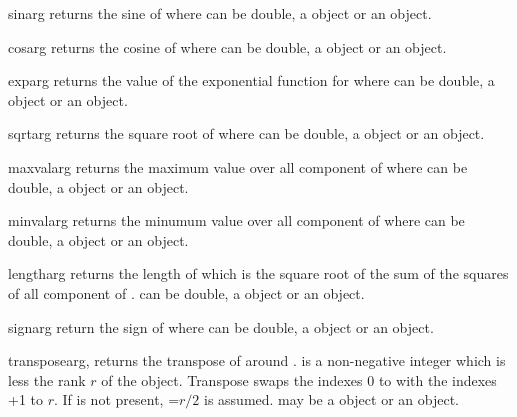 \begin{funcdesc}{sin}{arg}
returns the sine of  where 
can be double, a \Data object or an \numarray object.
\end{funcdesc}

\begin{funcdesc}{cos}{arg}
returns the cosine of  where 
can be double, a \Data object or an \numarray object.
\end{funcdesc}

\begin{funcdesc}{exp}{arg}
returns the value of the exponential function for  where 
can be double, a \Data object or an \numarray object.
\end{funcdesc}

\begin{funcdesc}{sqrt}{arg}
returns the square root of  where 
can be double, a \Data object or an \numarray object.
\end{funcdesc}

\begin{funcdesc}{maxval}{arg}
returns the maximum value over all component of  where 
can be double, a \Data object or an \numarray object.
\end{funcdesc}

\begin{funcdesc}{minval}{arg}
returns the minumum value over all component of  where 
can be double, a \Data object or an \numarray object.
\end{funcdesc}

\begin{funcdesc}{length}{arg}
returns the length of  which is the
square root of the sum of the squares of all component of . 
can be double, a \Data object or an \numarray object.
\end{funcdesc}

\begin{funcdesc}{sign}{arg}
return the sign of  where 
can be double, a \Data object or an \numarray object.
\end{funcdesc}

\begin{funcdesc}{transpose}{arg,}
returns the transpose of  around .  is a non-negative integer
which is less the rank $r$ of the object. Transpose swaps the indexes $0$ to 
with the indexes +1 to $r$. If  is not present, =$r/2$ is assumed.
may be a \Data object or an \numarray object.
\end{funcdesc}

